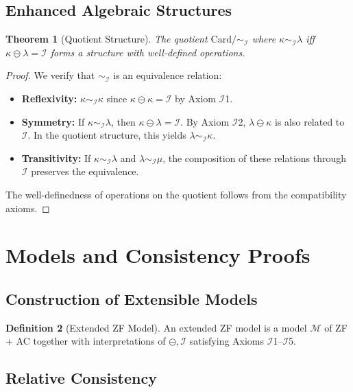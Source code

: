 \documentclass[12pt,a4paper]{article}
\newtheorem{theorem}{Theorem}[section]
\theoremstyle{definition}
\newtheorem{definition}[theorem]{Definition}
\theoremstyle{remark}
\begin{document}
\subsection{Enhanced Algebraic Structures}

\begin{theorem}[Quotient Structure]
The quotient $\text{Card}/\sim_{\mathcal{I}}$ where $\kappa \sim_{\mathcal{I}} \lambda$ iff $\kappa \ominus \lambda = \mathcal{I}$ forms a structure with well-defined operations.
\end{theorem}

\begin{proof}
We verify that $\sim_{\mathcal{I}}$ is an equivalence relation:
\begin{itemize}
\item \textbf{Reflexivity:} $\kappa \sim_{\mathcal{I}} \kappa$ since $\kappa \ominus \kappa = \mathcal{I}$ by Axiom $\mathcal{I}$1.
\item \textbf{Symmetry:} If $\kappa \sim_{\mathcal{I}} \lambda$, then $\kappa \ominus \lambda = \mathcal{I}$. By Axiom $\mathcal{I}$2, $\lambda \ominus \kappa$ is also related to $\mathcal{I}$. In the quotient structure, this yields $\lambda \sim_{\mathcal{I}} \kappa$.
\item \textbf{Transitivity:} If $\kappa \sim_{\mathcal{I}} \lambda$ and $\lambda \sim_{\mathcal{I}} \mu$, the composition of these relations through $\mathcal{I}$ preserves the equivalence.
\end{itemize}
The well-definedness of operations on the quotient follows from the compatibility axioms.
\end{proof}

\section{Models and Consistency Proofs}

\subsection{Construction of Extensible Models}

\begin{definition}[Extended ZF Model]
An extended ZF model is a model $\mathcal{M}$ of ZF + AC together with interpretations of $\ominus, \mathcal{I}$ satisfying Axioms $\mathcal{I}$1--$\mathcal{I}$5.
\end{definition}

\subsection{Relative Consistency}
\end{document}
